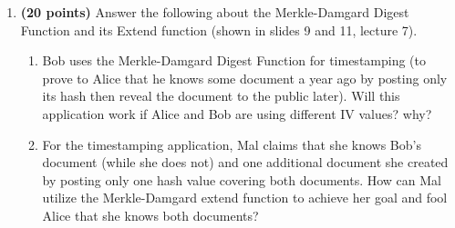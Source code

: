 \documentclass[12pt]{article}
\begin{document}
\begin{enumerate}
\item {\bf(20 points)} Answer the following about the Merkle-Damgard Digest Function and its Extend function (shown in slides 9 and 11, lecture 7).
\begin{enumerate}
    \item Bob uses the Merkle-Damgard Digest Function for timestamping (to prove to Alice that he knows some document a year ago by posting only its hash then reveal the document to the public later). Will this application work if Alice and Bob are using different IV values? why?

    \item For the timestamping application, Mal claims that she knows Bob's document (while she does not) and one additional document she created by posting only one hash value covering both documents. How can Mal utilize the Merkle-Damgard extend function to achieve her goal and fool Alice that she knows both documents? 
\end{enumerate}
\end{enumerate}
\end{document}
